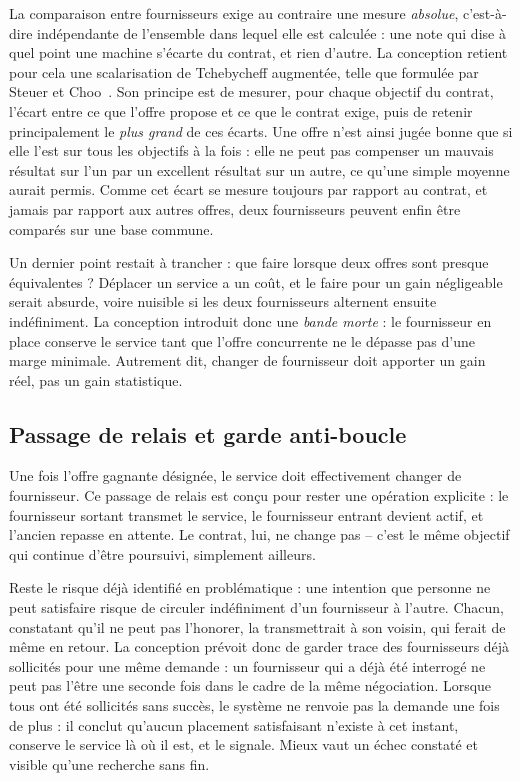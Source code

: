 La comparaison entre fournisseurs exige au contraire une mesure \emph{absolue}, c'est-à-dire indépendante de l'ensemble dans lequel elle est calculée : une note qui dise à quel point une machine s'écarte du contrat, et rien d'autre. La conception retient pour cela une scalarisation de Tchebycheff augmentée, telle que formulée par Steuer et Choo~\cite{steuer1983tchebycheff}. Son principe est de mesurer, pour chaque objectif du contrat, l'écart entre ce que l'offre propose et ce que le contrat exige, puis de retenir principalement le \emph{plus grand} de ces écarts. Une offre n'est ainsi jugée bonne que si elle l'est sur tous les objectifs à la fois : elle ne peut pas compenser un mauvais résultat sur l'un par un excellent résultat sur un autre, ce qu'une simple moyenne aurait permis. Comme cet écart se mesure toujours par rapport au contrat, et jamais par rapport aux autres offres, deux fournisseurs peuvent enfin être comparés sur une base commune.

Un dernier point restait à trancher : que faire lorsque deux offres sont presque équivalentes ? Déplacer un service a un coût, et le faire pour un gain négligeable serait absurde, voire nuisible si les deux fournisseurs alternent ensuite indéfiniment. La conception introduit donc une \emph{bande morte} : le fournisseur en place conserve le service tant que l'offre concurrente ne le dépasse pas d'une marge minimale. Autrement dit, changer de fournisseur doit apporter un gain réel, pas un gain statistique.

\subsection{Passage de relais et garde anti-boucle}

Une fois l'offre gagnante désignée, le service doit effectivement changer de fournisseur. Ce passage de relais est conçu pour rester une opération explicite : le fournisseur sortant transmet le service, le fournisseur entrant devient actif, et l'ancien repasse en attente. Le contrat, lui, ne change pas -- c'est le même objectif qui continue d'être poursuivi, simplement ailleurs.

Reste le risque déjà identifié en problématique : une intention que personne ne peut satisfaire risque de circuler indéfiniment d'un fournisseur à l'autre. Chacun, constatant qu'il ne peut pas l'honorer, la transmettrait à son voisin, qui ferait de même en retour. La conception prévoit donc de garder trace des fournisseurs déjà sollicités pour une même demande : un fournisseur qui a déjà été interrogé ne peut pas l'être une seconde fois dans le cadre de la même négociation. Lorsque tous ont été sollicités sans succès, le système ne renvoie pas la demande une fois de plus : il conclut qu'aucun placement satisfaisant n'existe à cet instant, conserve le service là où il est, et le signale. Mieux vaut un échec constaté et visible qu'une recherche sans fin.

